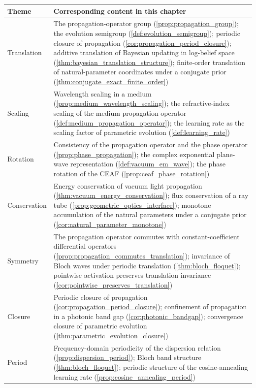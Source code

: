 \begin{remark}\label{rem:propagation_seven_themes}
\leavevmode\par
\begin{center}
\small
\renewcommand{\arraystretch}{1.3}
\setlength{\tabcolsep}{4pt}
\begin{tabularx}{\linewidth}{@{}>{\raggedright\arraybackslash\hspace{0pt}}p{2.8cm} >{\raggedright\arraybackslash\hspace{0pt}}X@{}}
\toprule
Theme & Corresponding content in this chapter \\
\midrule
Translation & The propagation-operator group (\cref{prop:propagation_group}); the evolution semigroup (\cref{def:evolution_semigroup}); periodic closure of propagation (\cref{cor:propagation_period_closure}); additive translation of Bayesian updating in log-belief space (\cref{thm:bayesian_translation_structure}); finite-order translation of natural-parameter coordinates under a conjugate prior (\cref{thm:conjugate_exact_finite_order}) \\
Scaling & Wavelength scaling in a medium (\cref{prop:medium_wavelength_scaling}); the refractive-index scaling of the medium propagation operator (\cref{def:medium_propagation_operator}); the learning rate as the scaling factor of parametric evolution (\cref{def:learning_rate}) \\
Rotation & Consistency of the propagation operator and the phase operator (\cref{prop:phase_propagation}); the complex exponential plane-wave representation (\cref{def:vacuum_em_wave}); the phase rotation of the CEAF (\cref{prop:ceaf_phase_rotation}) \\
Conservation & Energy conservation of vacuum light propagation (\cref{thm:vacuum_energy_conservation}); flux conservation of a ray tube (\cref{prop:geometric_optics_interface}); monotone accumulation of the natural parameters under a conjugate prior (\cref{cor:natural_parameter_monotone}) \\
Symmetry & The propagation operator commutes with constant-coefficient differential operators (\cref{prop:propagation_commutes_translation}); invariance of Bloch waves under periodic translation (\cref{thm:bloch_floquet}); pointwise activation preserves translation invariance (\cref{cor:pointwise_preserves_translation}) \\
Closure & Periodic closure of propagation (\cref{cor:propagation_period_closure}); confinement of propagation in a photonic band gap (\cref{cor:photonic_bandgap}); convergence closure of parametric evolution (\cref{thm:parametric_evolution_closure}) \\
Period & Frequency-domain periodicity of the dispersion relation (\cref{prop:dispersion_period}); Bloch band structure (\cref{thm:bloch_floquet}); periodic structure of the cosine-annealing learning rate (\cref{prop:cosine_annealing_period}) \\
\bottomrule
\end{tabularx}
\end{center}
\end{remark}

